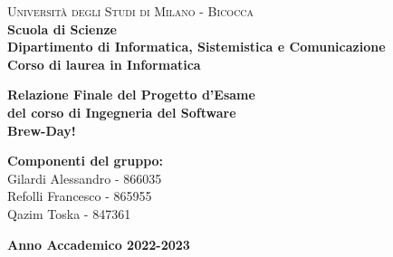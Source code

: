 \documentclass[a4paper,12pt]{report}
\begin{document}
    
    \begin{titlepage}
        
        \noindent
        \begin{minipage}[t]{0.19\textwidth}
        \end{minipage}
        \begin{minipage}[t]{0.81\textwidth}
        {
                {\textsc{Università degli Studi di Milano - Bicocca}} \\
                \textbf{Scuola di Scienze} \\
                \textbf{Dipartimento di Informatica, Sistemistica e Comunicazione} \\
                \textbf{Corso di laurea in Informatica} \\
                \par
        }
        \end{minipage}
        
	\vspace{55mm}
        
	\begin{center}
            {\LARGE{
                    \textbf{Relazione Finale del Progetto d'Esame\\ del corso di Ingegneria del Software \\ Brew-Day! }
                    \par
            }}
        \end{center}
        
        \vspace{50mm}
  

        \begin{flushright}
            {\large \textbf{Componenti del gruppo:}} \\
            \large{Gilardi Alessandro - 866035} \\
            \large{Refolli Francesco - 865955} \\
            \large{Qazim Toska - 847361} \\
        \end{flushright}
        
        \vspace{40mm}
        \begin{center}
            {\large{\bf Anno Accademico 2022-2023}}
        \end{center}

        \restoregeometry
        
    \end{titlepage}
    
\end{document}
